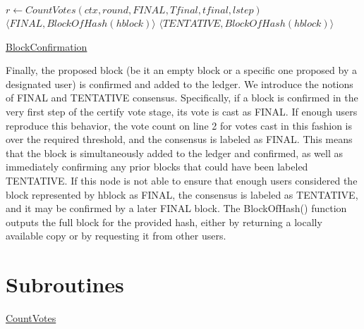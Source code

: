 \documentclass[10pt,a4paper]{article}
\begin{document}
\begin{algorithm}
    \begin{algorithmic}[H]

    \State $r \gets CountVotes(ctx, round, FINAL, Tfinal, tfinal, lstep)$
        \State \Return $\langle FINAL, BlockOfHash(hblock)\rangle$ 
    \Else
    {
        \State \Return $\langle TENTATIVE, BlockOfHash(hblock)\rangle $
    }
    \EndIf
    \EndFunction
    \end{algorithmic}
    \caption{\underline{BlockConfirmation}}
\end{algorithm}

Finally, the proposed block (be it an empty block or a specific one 
proposed by a designated user) is confirmed and added to the ledger.
We introduce the notions of FINAL and TENTATIVE consensus.
Specifically, if a block is confirmed in the very first step of the 
certify vote stage, its vote is cast as FINAL.
If enough users reproduce this behavior, the vote count on line 2 for 
votes cast in this fashion is over the required threshold, and the 
consensus is labeled as FINAL.
This means that the block is simultaneously added to the ledger and 
confirmed, as well as immediately confirming any prior blocks that 
could have been labeled TENTATIVE.
If this node is not able to ensure that enough users considered the 
block represented by hblock as FINAL, the consensus is labeled as 
TENTATIVE, and it may be confirmed by a later FINAL block.
The BlockOfHash() function outputs the full block for the provided 
hash, either by returning a locally available copy or by requesting 
it from other users.

\section{Subroutines}

\begin{algorithm}
    \begin{algorithmic}[H]


    \EndFunction
    \end{algorithmic}
    \caption{\underline{CountVotes}}
\end{algorithm}
\end{document}
